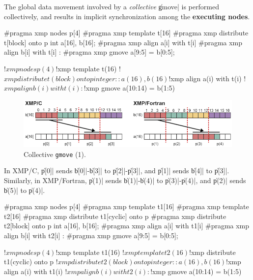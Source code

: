 

The global data movement involved by a {\it collective} \|gmove| is performed
collectively, and results in implicit synchronization among the 
{\bf executing nodes}.

\begin{XCexample}
#pragma xmp nodes p[4]
#pragma xmp template t[16]
#pragma xmp distribute t[block] onto p
int a[16], b[16];
#pragma xmp align a[i] with t[i]
#pragma xmp align b[i] with t[i]
     :
#pragma xmp gmove
  a[9:5] = b[0:5];
\end{XCexample}

\begin{XFexample}
!$xmp nodes p(4)
!$xmp template t(16)
!$xmp distribute t(block) onto p
integer :: a(16), b(16)
!$xmp align a(i) with t(i)
!$xmp align b(i) with t(i)
     :
!$xmp gmove
  a(10:14) = b(1:5)
\end{XFexample}

\begin{figure}
  \centering
  \includegraphics[width=\textwidth]{figs/gmove.png}
  \caption{Collective {\tt gmove} (1).}
\end{figure}

In XMP/C, \|p[0]| sends \|b[0]|-\|b[3]| to \|p[2]|-\|p[3]|, and \|p[1]|
sends \|b[4]| to \|p[3]|. Similarly, in XMP/Fortran, \|p(1)| sends
\|b(1)|-\|b(4)| to \|p(3)|-\|p(4)|, and \|p(2)| sends \|b(5)| to \|p(4)|.

\begin{XCexample}
#pragma xmp nodes p[4]
#pragma xmp template t1[16]
#pragma xmp template t2[16]
#pragma xmp distribute t1[cyclic] onto p
#pragma xmp distribute t2[block] onto p
int a[16], b[16];
#pragma xmp align a[i] with t1[i]
#pragma xmp align b[i] with t2[i]
     :
#pragma xmp gmove
  a[9:5] = b[0:5];
\end{XCexample}

\begin{XFexample}
!$xmp nodes p(4)
!$xmp template t1(16)
!$xmp template t2(16)
!$xmp distribute t1(cyclic) onto p
!$xmp distribute t2(block) onto p
integer :: a(16), b(16)
!$xmp align a(i) with t1(i)
!$xmp align b(i) with t2(i)
     :
!$xmp gmove
  a(10:14) = b(1:5)
\end{XFexample}

